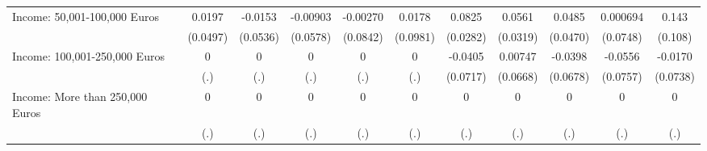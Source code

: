 {\begin{tabular}{l*{10}{c}}
Income: 50,001-100,000 Euros&      0.0197         &     -0.0153         &    -0.00903         &    -0.00270         &      0.0178         &      0.0825\sym{**} &      0.0561         &      0.0485         &    0.000694         &       0.143         \\
            &    (0.0497)         &    (0.0536)         &    (0.0578)         &    (0.0842)         &    (0.0981)         &    (0.0282)         &    (0.0319)         &    (0.0470)         &    (0.0748)         &     (0.108)         \\
\addlinespace
Income: 100,001-250,000 Euros&           0         &           0         &           0         &           0         &           0         &     -0.0405         &     0.00747         &     -0.0398         &     -0.0556         &     -0.0170         \\
            &         (.)         &         (.)         &         (.)         &         (.)         &         (.)         &    (0.0717)         &    (0.0668)         &    (0.0678)         &    (0.0757)         &    (0.0738)         \\
\addlinespace
Income: More than 250,000 Euros&           0         &           0         &           0         &           0         &           0         &           0         &           0         &           0         &           0         &           0         \\
            &         (.)         &         (.)         &         (.)         &         (.)         &         (.)         &         (.)         &         (.)         &         (.)         &         (.)         &         (.)         \\
\bottomrule
\end{tabular}
}
